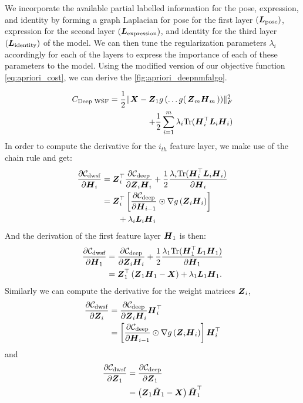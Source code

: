 \documentclass[10pt,journal,compsoc]{IEEEtran}
\begin{document}
We incorporate the available partial labelled information for the pose, expression, and identity by forming a graph Laplacian for pose for the first layer $(\boldsymbol{L}_{\text{pose}})$, expression for the second layer $(\boldsymbol{L}_{\text{expression}})$, and identity for the third layer $(\boldsymbol{L}_{\text{identity}})$ of the model. We can then tune the regularization parameters $\lambda_i$ accordingly for each of the layers to express the importance of each of these parameters to the \dwsf{} model. Using the modified version of our objective function \autoref{eq:apriori_cost}, we can derive the \autoref{fig:apriori_deepnmfalgo}.




\begin{align} \label{eq:apriori_cost} \notag
C_{\text{{Deep WSF}}} = \frac{1}{2}\|{\boldsymbol{X}} - \boldsymbol{Z}_1 g\left(\ldots g\right(\boldsymbol{Z}_m {\boldsymbol{H}_m\left)\right)}\|^2_F  \\ + \frac{1}{2}\sum_{i=1}^{m} \lambda_i \text{Tr}(\boldsymbol{H}_i^\top \boldsymbol{L}_i \boldsymbol{H}_i)
\end{align}
In order to compute the derivative for the $i_{th}$ feature layer, we make use of the chain rule and get:
\begin{align*}
    \dfrac{\partial\mathcal{C}_{\text{dwsf}}}{\partial\boldsymbol{H}_i} &= \boldsymbol{Z}^{\top}_i \dfrac{\partial\mathcal{C}_{\text{deep}}}{\partial {\boldsymbol{Z}_i \boldsymbol{H}_i}} + \frac{1}{2}\dfrac{\lambda_i \text{Tr}(\boldsymbol{H}_i^\top \boldsymbol{L}_i \boldsymbol{H}_i)}{\partial \boldsymbol{H}_i}  \\
 &= \boldsymbol{Z}^{\top}_i \left[\dfrac{\partial\mathcal{C}_{\text{deep}}}{\partial \boldsymbol{H}_{i-1}} \odot \nabla g\left({\boldsymbol{Z}_i \boldsymbol{H}_i}\right)\right] \\ & \qquad +   \lambda_i \boldsymbol{L}_i \boldsymbol{H}_i
\end{align*}
And the derivation of the first feature layer $\boldsymbol{H}_1$ is then:
\begin{align*}
\dfrac{\partial\mathcal{C}_{\text{dwsf}}}{\partial \boldsymbol{H}_1} &=  \dfrac{\partial\mathcal{C}_{\text{deep}}}{\partial {\boldsymbol{Z}_i \boldsymbol{H}_i}} + \frac{1}{2} \dfrac{\lambda_1 \text{Tr}(\boldsymbol{H}_1^\top \boldsymbol{L}_1 \boldsymbol{H}_1)}{\partial \boldsymbol{H}_1} \\
& = \boldsymbol{Z}_1^{\top} \left(\boldsymbol{Z}_1 \boldsymbol{H}_1  - \boldsymbol{X} \right) + \lambda_1 \boldsymbol{L}_1 \boldsymbol{H}_1.
\end{align*}
Similarly we can compute the derivative for the weight matrices $\boldsymbol{Z}_i$, 
\begin{align*}
\dfrac{\partial\mathcal{C}_{\text{dwsf}}}{\partial \boldsymbol{Z}_i} &= \dfrac{\partial\mathcal{C}_{\text{deep}}}{\partial {\boldsymbol{Z}_i \boldsymbol{ H}_i}} \boldsymbol{ H}^{\top}_i \\
 &= \left[\dfrac{\partial\mathcal{C}_{\text{deep}}}{\partial \boldsymbol{H}_{i-1}} \odot \nabla g\left({\boldsymbol{Z}_i \boldsymbol{ H}_i}\right)\right] \boldsymbol{ H}^{\top}_i
\end{align*} and \begin{align*}
\dfrac{\partial\mathcal{C}_{\text{dwsf}}}{\partial \boldsymbol{Z}_1} &= \dfrac{\partial \mathcal{C}_{\text{deep}}}{\partial \boldsymbol{Z}_1} \\
& =   \left(\boldsymbol{Z}_1 \boldsymbol{\tilde{H}}_1 - \boldsymbol{X}\right) \boldsymbol{\tilde{H}}_1^\top 
\end{align*}
\end{document}
